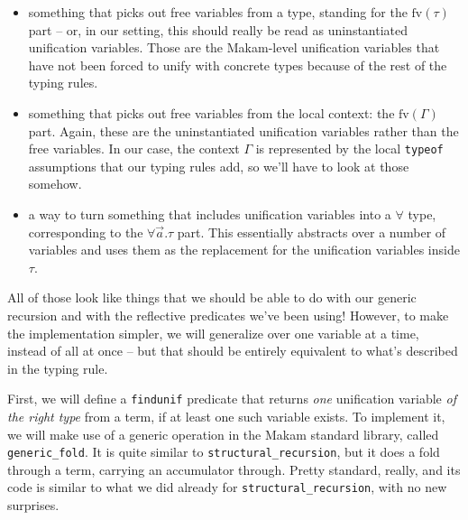 \begin{itemize}
\tightlist
\item
  something that picks out free variables from a type, standing for the
  \(\text{fv}(\tau)\) part -- or, in our setting, this should really be
  read as uninstantiated unification variables. Those are the
  Makam-level unification variables that have not been forced to unify
  with concrete types because of the rest of the typing rules.
\item
  something that picks out free variables from the local context: the
  \(\text{fv}(\Gamma)\) part. Again, these are the uninstantiated
  unification variables rather than the free variables. In our case, the
  context \(\Gamma\) is represented by the local \texttt{typeof}
  assumptions that our typing rules add, so we'll have to look at those
  somehow.
\item
  a way to turn something that includes unification variables into a
  \(\forall\) type, corresponding to the \(\forall \vec{a}.\tau\) part.
  This essentially abstracts over a number of variables and uses them as
  the replacement for the unification variables inside \(\tau\).
\end{itemize}

All of those look like things that we should be able to do with our
generic recursion and with the reflective predicates we've been using!
However, to make the implementation simpler, we will generalize over one
variable at a time, instead of all at once -- but that should be
entirely equivalent to what's described in the typing rule.

First, we will define a \texttt{findunif} predicate that returns
\emph{one} unification variable \emph{of the right type} from a term, if
at least one such variable exists. To implement it, we will make use of
a generic operation in the Makam standard library, called
\texttt{generic\_fold}. It is quite similar to
\texttt{structural\_recursion}, but it does a fold through a term,
carrying an accumulator through. Pretty standard, really, and its code
is similar to what we did already for \texttt{structural\_recursion},
with no new surprises.

